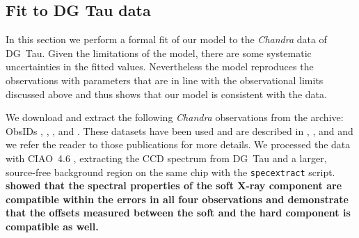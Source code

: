 \documentclass[manuscript]{aastex}
\begin{document}
\subsection{Fit to DG Tau data}
In this section we perform a formal fit of our model to the \emph{Chandra} data of DG~Tau. 
Given the limitations of the model, there are some systematic uncertainties in the fitted values. Nevertheless the model reproduces the observations with parameters that are in line with the observational limits discussed above and thus shows that our model is consistent with the data.

We download and extract the following \emph{Chandra} observations from the archive: ObsIDs , , , and . These datasets have been used and are described in \citet{2008A&A...478..797G}, \citet{2008A&A...488L..13S}, and \citet{2009A&A...493..579G} and we refer the reader to those publications for more details. We processed the data with CIAO~4.6 \citep{2006SPIE.6270E..60F}, extracting the CCD spectrum from DG~Tau and a larger, source-free background region on the same chip with the \texttt{specextract} script.  \textbf{\citet{2008A&A...478..797G} showed that the spectral properties of the soft X-ray component are compatible within the errors in all four observations and \citet{2008A&A...488L..13S} demonstrate that the offsets measured between the soft and the hard component is compatible as well.} 
\end{document}
